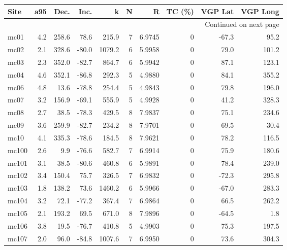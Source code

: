 \documentclass{article}
\begin{document}
\begin{longtable}{lrrrrrrrrr}
\toprule
  Site &  a95 &   Dec. &  Inc. &   k     &   N &        R &  TC (\%) &  VGP Lat &  VGP Long \\
\midrule
\endhead
\midrule
\multicolumn{10}{r}{{Continued on next page}} \\
\midrule
\endfoot

\bottomrule
\endlastfoot
  mc01 &  4.2 &  258.6 &  78.6 &   215.9 &   7 &   6.9745 &       0 &    -67.3 &      95.2 \\
  mc02 &  2.1 &  328.6 & -80.0 &  1079.2 &   6 &   5.9958 &       0 &     79.0 &     101.2 \\
  mc03 &  2.3 &  352.0 & -82.7 &   864.7 &   6 &   5.9942 &       0 &     87.1 &     123.1 \\
  mc04 &  4.6 &  352.1 & -86.8 &   292.3 &   5 &   4.9880 &       0 &     84.1 &     355.2 \\
  mc06 &  4.8 &   13.6 & -78.8 &   254.4 &   5 &   4.9843 &       0 &     79.8 &     196.0 \\
  mc07 &  3.2 &  156.9 & -69.1 &   555.9 &   5 &   4.9928 &       0 &     41.2 &     328.3 \\
  mc08 &  2.7 &   38.5 & -78.3 &   429.5 &   8 &   7.9837 &       0 &     75.1 &     234.6 \\
  mc09 &  3.6 &  259.9 & -82.7 &   234.2 &   8 &   7.9701 &       0 &     69.5 &      30.4 \\
  mc10 &  4.1 &  335.3 & -78.6 &   184.5 &   8 &   7.9621 &       0 &     78.2 &     116.5 \\
 mc100 &  2.6 &    9.9 & -76.6 &   582.7 &   7 &   6.9914 &       0 &     75.9 &     180.6 \\
 mc101 &  3.1 &   38.5 & -80.6 &   460.8 &   6 &   5.9891 &       0 &     78.4 &     239.0 \\
 mc102 &  3.4 &  150.4 &  75.7 &   326.5 &   7 &   6.9832 &       0 &    -72.3 &     295.8 \\
 mc103 &  1.8 &  138.2 &  73.6 &  1460.2 &   6 &   5.9966 &       0 &    -67.0 &     283.3 \\
 mc104 &  3.2 &   72.1 & -77.2 &   367.4 &   7 &   6.9864 &       0 &     66.5 &     262.2 \\
 mc105 &  2.1 &  193.2 &  69.5 &   671.0 &   8 &   7.9896 &       0 &    -64.5 &       1.8 \\
 mc106 &  3.8 &   19.5 & -76.7 &   410.8 &   5 &   4.9903 &       0 &     75.3 &     197.5 \\
 mc107 &  2.0 &   96.0 & -84.8 &  1007.6 &   7 &   6.9950 &       0 &     73.6 &     304.3 \\

\end{longtable}
\end{document}
